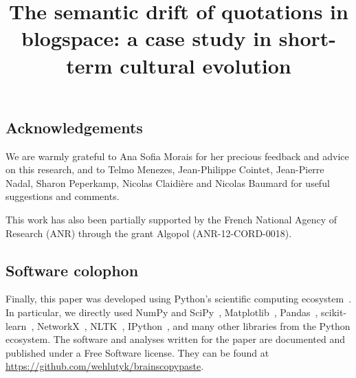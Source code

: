 \documentclass[jou]{apa6}
\title{The semantic drift of quotations in blogspace: a case study in short-term cultural evolution}
\date{}
\newcommand{\tg}[1]{{#1}}
\newcommand{\newtext}[1]{\tg{#1}}
\newenvironment{new}{\par}{\par}
\begin{document}
\maketitle

\setcounter{secnumdepth}{3}







\subsection*{Acknowledgements}

We are warmly grateful to Ana Sofia Morais for her precious feedback and advice on this research, and to Telmo Menezes, Jean-Philippe Cointet, Jean-Pierre Nadal, Sharon Peperkamp, \newtext{Nicolas Claidière} and Nicolas Baumard for useful suggestions and comments.

{\new This work has also been partially supported by the French National Agency of Research (ANR) through the grant Algopol (ANR-12-CORD-0018).}

\begin{new}

\subsection*{Software colophon}

Finally, this paper was developed using Python's scientific computing ecosystem~\citep{millman_python_2011}.
In particular, we directly used NumPy and SciPy~\citep{walt_numpy_2011}, Matplotlib~\citep{hunter_matplotlib:_2007}, Pandas~\citep{mckinney_data_2010}, scikit-learn~\citep{pedregosa_scikit-learn:_2011}, NetworkX~\citep{hagberg_exploring_2008}, NLTK~\citep{bird_nltk_2009}, IPython~\citep{perez_ipython:_2007}, and many other libraries from the Python ecosystem.
The software and analyses written for the paper are documented and published under a Free Software license.
They can be found at \url{https://github.com/wehlutyk/brainscopypaste}.

\end{new}

\setcounter{secnumdepth}{0}



\end{document}
